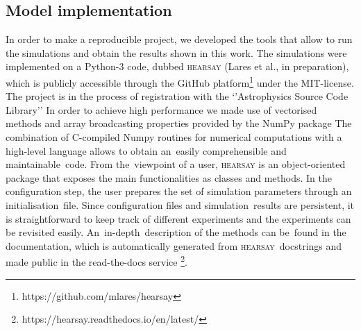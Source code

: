 \documentclass[crop]{CSLB}
\newcommand{\hs}{\textsc{hearsay}}
\begin{document}
%


\subsection{Model implementation}


%
In order to make a reproducible project, we developed the tools
that allow to run the simulations and obtain the results shown in this work.
%
The simulations were implemented on a Python-3 code, dubbed \hs{} (Lares et al., in preparation),
which is publicly accessible through the GitHub
platform\footnote{https://github.com/mlares/hearsay} under the
MIT-license.
%
The project is in the process of registration with the ‘’Astrophysics
Source Code Library’’ \citep[ASCL, ][]{2015JORS....3E..15A,
2020ASPC..522..731A}
%
In order to achieve high performance we made use of vectorised methods
and array broadcasting properties provided by the NumPy package
\citep{oliphant_numpy_2006, vanderwalt_numpy_2011}
%
The combination of C-compiled Numpy routines for numerical
computations with a high-level language allows to obtain an easily
comprehensible and maintainable code.
%
From the viewpoint of a user, \hs{} is an object-oriented package that
exposes the main functionalities as classes and methods.
%
In the configuration step, the user prepares the set of simulation
parameters through an initialisation file.
%
Since configuration files and simulation results are persistent, it is
straightforward to keep track of different experiments and the
experiments can be revisited easily.
%
An in-depth description of the methods can be found in the
documentation, which is automatically generated from \hs{} docstrings
and made public in the read-the-docs service
\footnote{https://hearsay.readthedocs.io/en/latest/}.
\end{document}
